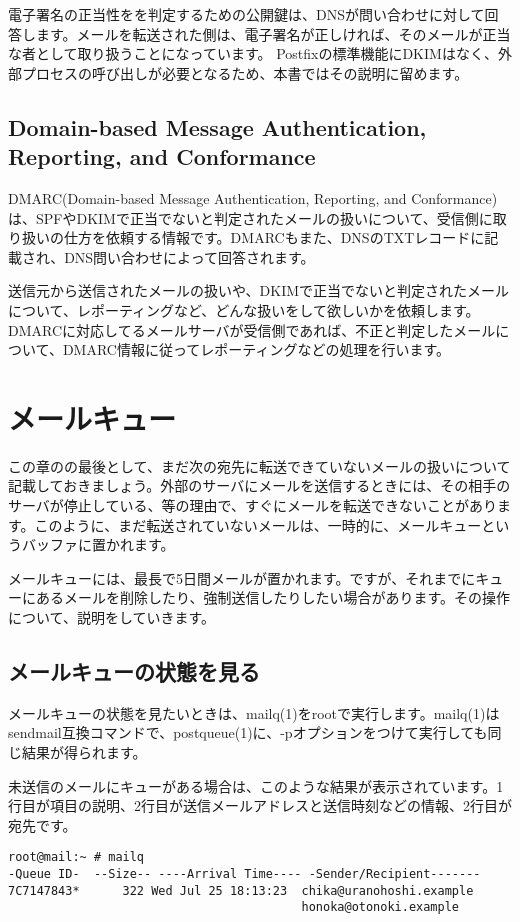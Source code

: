 {電子署名の正当性をを判定するための公開鍵は、DNSが問い合わせに対して回答します。メールを転送された側は、電子署名が正しければ、そのメールが正当な者として取り扱うことになっています。
Postfixの標準機能にDKIMはなく、外部プロセスの呼び出しが必要となるため、本書ではその説明に留めます。

\subsection{Domain-based Message Authentication, Reporting, and Conformance}
DMARC(Domain-based Message Authentication, Reporting, and Conformance)は、SPFやDKIMで正当でないと判定されたメールの扱いについて、受信側に取り扱いの仕方を依頼する情報です。DMARCもまた、DNSのTXTレコードに記載され、DNS問い合わせによって回答されます。

送信元から送信されたメールの扱いや、DKIMで正当でないと判定されたメールについて、レポーティングなど、どんな扱いをして欲しいかを依頼します。
DMARCに対応してるメールサーバが受信側であれば、不正と判定したメールについて、DMARC情報に従ってレポーティングなどの処理を行います。


\section{メールキュー}

この章のの最後として、まだ次の宛先に転送できていないメールの扱いについて記載しておきましょう。外部のサーバにメールを送信するときには、その相手のサーバが停止している、等の理由で、すぐにメールを転送できないことがあります。このように、まだ転送されていないメールは、一時的に、メールキューというバッファに置かれます。

メールキューには、最長で5日間メールが置かれます。ですが、それまでにキューにあるメールを削除したり、強制送信したりしたい場合があります。その操作について、説明をしていきます。

\subsection{メールキューの状態を見る}
メールキューの状態を見たいときは、mailq(1)をrootで実行します。mailq(1)はsendmail互換コマンドで、postqueue(1)に、-pオプションをつけて実行しても同じ結果が得られます。

未送信のメールにキューがある場合は、このような結果が表示されています。1行目が項目の説明、2行目が送信メールアドレスと送信時刻などの情報、2行目が宛先です。

\begin{verbatim}
root@mail:~ # mailq
-Queue ID-  --Size-- ----Arrival Time---- -Sender/Recipient-------
7C7147843*      322 Wed Jul 25 18:13:23  chika@uranohoshi.example
                                         honoka@otonoki.example



\end{verbatim}}
